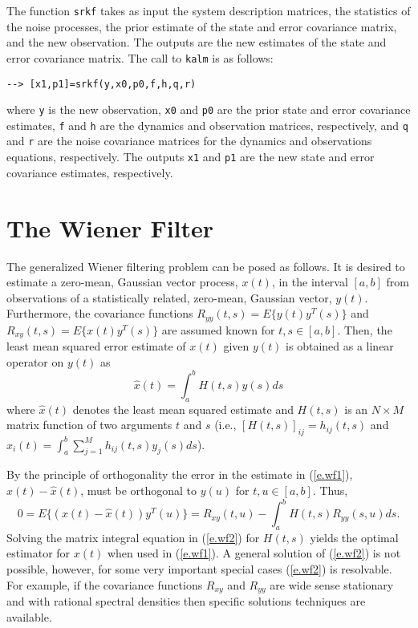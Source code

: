 	The function {\tt srkf} takes as input the system description
matrices, the statistics of the noise processes, the prior estimate of 
the state and error covariance matrix, and the new observation.  The
outputs are the new estimates of the state and error covariance
matrix.  The call to {\tt kalm} is as follows:
\begin{verbatim}
--> [x1,p1]=srkf(y,x0,p0,f,h,q,r)
\end{verbatim}
where {\tt y} is the new observation, {\tt x0} and {\tt p0} are the
prior state and error covariance estimates, {\tt f} and {\tt h} are
the dynamics and observation matrices, respectively, and {\tt q} 
and {\tt r} are the noise covariance matrices for the dynamics and
observations equations, respectively.  The outputs {\tt x1} and {\tt p1}
are the new state and error covariance estimates, respectively.

\section{The Wiener Filter}

	The generalized Wiener filtering problem \cite{Kailath1}
can be posed as follows.  It is desired
to estimate a zero-mean, Gaussian vector process, $x(t)$, in the
interval $[a,b]$ from observations of a statistically
related, zero-mean, Gaussian vector, $y(t)$.  Furthermore, the covariance
functions $R_{yy}(t,s)=E\{y(t)y^T(s)\}$ and $R_{xy}(t,s)=E\{x(t)y^T(s)\}$
are assumed known for $t,s\in[a,b]$.  Then, the least mean squared 
error  estimate of $x(t)$ given $y(t)$ is obtained
as a linear operator on $y(t)$ as
%
\begin{equation}
\hat{x}(t)=\int_{a}^{b}H(t,s)y(s)ds
\label{e.wf1}
\end{equation}
%
where $\hat{x}(t)$ denotes the least mean squared estimate and
$H(t,s)$ is an $N\times M$ matrix function of two arguments $t$
and $s$ (i.e., $[H(t,s)]_{ij}=h_{ij}(t,s)$ and $\hat{x}_i(t)=\int_{a}^{b}
\sum_{j=1}^{M}h_{ij}(t,s)y_j(s)ds$).

	By the principle of orthogonality the error 
in the estimate in (\ref{e.wf1}), $x(t)-\hat{x}(t)$, must
be orthogonal to $y(u)$ for $t,u\in[a,b]$.  Thus,
%
\begin{equation}
0=E\{(x(t)-\hat{x}(t))y^T(u)\}=R_{xy}(t,u)-\int_{a}^{b}H(t,s)R_{yy}(s,u)ds.
\label{e.wf2}
\end{equation}
%
Solving the matrix integral equation in (\ref{e.wf2}) for $H(t,s)$ yields
the optimal estimator for $x(t)$ when used in (\ref{e.wf1}).
A general solution of (\ref{e.wf2}) is not possible, however,
for some very important special cases (\ref{e.wf2}) is 
resolvable.  For example, if the covariance functions $R_{xy}$
and $R_{yy}$ are wide sense
stationary and with rational spectral densities then
specific solutions techniques are available.

